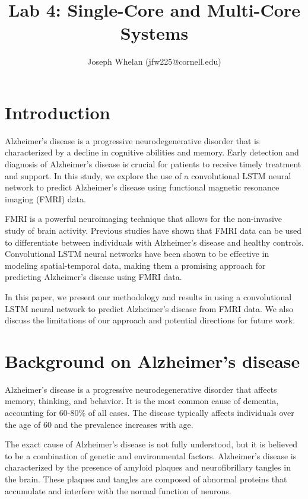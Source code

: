 \documentclass[10pt]{article}
\title{Lab 4: Single-Core and Multi-Core Systems}
\author{Joseph Whelan (jfw225@cornell.edu)}
\begin{document}
 
	
	\maketitle
	
	\section{Introduction}

	Alzheimer's disease is a progressive neurodegenerative disorder that is characterized by a decline in cognitive abilities and memory. Early detection and diagnosis of Alzheimer's disease is crucial for patients to receive timely treatment and support. In this study, we explore the use of a convolutional LSTM neural network to predict Alzheimer's disease using functional magnetic resonance imaging (FMRI) data.

	FMRI is a powerful neuroimaging technique that allows for the non-invasive study of brain activity. Previous studies have shown that FMRI data can be used to differentiate between individuals with Alzheimer's disease and healthy controls. Convolutional LSTM neural networks have been shown to be effective in modeling spatial-temporal data, making them a promising approach for predicting Alzheimer's disease using FMRI data.

	In this paper, we present our methodology and results in using a convolutional LSTM neural network to predict Alzheimer's disease from FMRI data. We also discuss the limitations of our approach and potential directions for future work.

	\section{Background on Alzheimer's disease}

	Alzheimer's disease is a progressive neurodegenerative disorder that affects memory, thinking, and behavior. It is the most common cause of dementia, accounting for 60-80\% of all cases. The disease typically affects individuals over the age of 60 and the prevalence increases with age.

	The exact cause of Alzheimer's disease is not fully understood, but it is believed to be a combination of genetic and environmental factors. Alzheimer's disease is characterized by the presence of amyloid plaques and neurofibrillary tangles in the brain. These plaques and tangles are composed of abnormal proteins that accumulate and interfere with the normal function of neurons.
\end{document}
